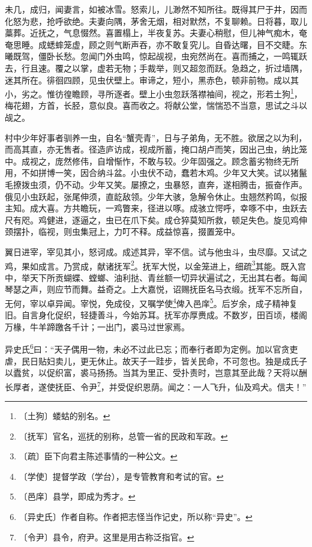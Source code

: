\documentclass[12pt,UTF-8,openany,a4]{ctexbook}
\begin{document}
\begin{large}
    未几，成归，闻妻言，如被冰雪。怒索儿，儿渺然不知所往。既得其尸于井，因而化怒为悲，抢呼欲绝。夫妻向隅，茅舍无烟，相对默然，不复聊赖。日将暮，取儿藁葬。近抚之，气息惙然。喜置榻上，半夜复苏。夫妻心稍慰，但儿神气痴木，奄奄思睡。成蟋蟀笼虚，顾之则气断声吞，亦不敢复究儿。自昏达曙，目不交睫。东曦既驾，僵卧长愁。忽闻门外虫鸣，惊起觇视，虫宛然尚在。喜而捕之，一鸣辄跃去，行且速。覆之以掌，虚若无物；手裁举，则又超忽而跃。急趋之，折过墙隅，迷其所在。徘徊四顾，见虫伏壁上。审谛之，短小，黑赤色，顿非前物。成以其小，劣之。惟彷徨瞻顾，寻所逐者。壁上小虫忽跃落襟袖间，视之，形若土狗\footnote{〔土狗〕\yiwen 蝼蛄的别名。}，梅花翅，方首，长胫，意似良。喜而收之。将献公堂，惴惴恐不当意，思试之斗以觇之。
    
    村中少年好事者驯养一虫，自名“蟹壳青”，日与子弟角，无不胜。欲居之以为利，而高其直，亦无售者。径造庐访成，视成所蓄，掩口胡卢而笑，因出己虫，纳比笼中。成视之，庞然修伟，自增惭怍，不敢与较。少年固强之。顾念蓄劣物终无所用，不如拼博一笑，因合纳斗盆。小虫伏不动，蠢若木鸡。少年又大笑。试以猪鬣毛撩拨虫须，仍不动。少年又笑。屡撩之，虫暴怒，直奔，遂相腾击，振奋作声。俄见小虫跃起，张尾伸须，直龁敌领。少年大骇，急解令休止。虫翘然矜鸣，似报主知。成大喜。方共瞻玩，一鸡瞥来，径进以啄。成骇立愕呼，幸啄不中，虫跃去尺有咫。鸡健进，逐逼之，虫已在爪下矣。成仓猝莫知所救，顿足失色。旋见鸡伸颈摆扑，临视，则虫集冠上，力叮不释。成益惊喜，掇置笼中。
    
    翼日进宰，宰见其小，怒诃成。成述其异，宰不信。试与他虫斗，虫尽靡。又试之鸡，果如成言。乃赏成，献诸抚军\footnote{〔抚军〕\yiwen 官名，巡抚的别称，总管一省的民政和军政。}。抚军大悦，以金笼进上，细疏\footnote{〔疏〕\yiwen 臣下向君主陈述事情的一种公文。}其能。既入宫中，举天下所贡蝴蝶、螳螂、油利挞、青丝额一切异状遍试之，无出其右者。每闻琴瑟之声，则应节而舞。益奇之。上大嘉悦，诏赐抚臣名马衣缎。抚军不忘所自，无何，宰以卓异闻。宰悦，免成役，又嘱学使\footnote{〔学使〕\yiwen 提督学政（学台），是专管教育和考试的官。}俾入邑庠\footnote{〔邑庠〕\yiwen 县学，即成为秀才。}。后岁余，成子精神复旧。自言身化促织，轻捷善斗，今始苏耳。抚军亦厚赉成。不数岁，田百顷，楼阁万椽，牛羊蹄躈各千计；一出门，裘马过世家焉。
    
    异史氏\footnote{〔异史氏〕\yiwen 作者自称。作者把志怪当作记史，所以称“异史”。}曰：“天子偶用一物，未必不过此已忘；而奉行者即为定例。加以官贪吏虐，民日贴妇卖儿，更无休止。故天子一跬步，皆关民命，不可忽也。独是成氏子以蠹贫，以促织富，裘马扬扬。当其为里正、受扑责时，岂意其至此哉？天将以酬长厚者，遂使抚臣、令尹\footnote{〔令尹〕\yiwen 县令，府尹。这里是用古称泛指官。}，并受促织恩荫。闻之：一人飞升，仙及鸡犬。信夫！”

\end{large}
\end{document}
